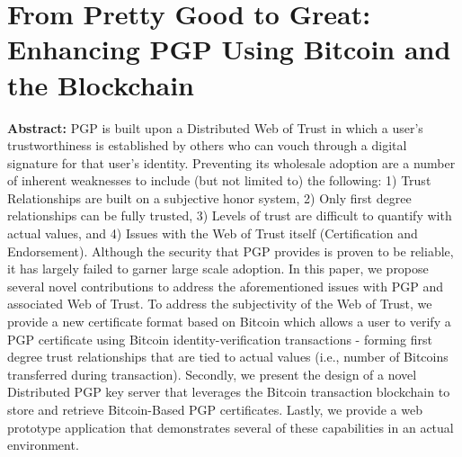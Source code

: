 \section{From Pretty Good to Great: Enhancing PGP Using Bitcoin and the Blockchain}

\textbf{Abstract:} 
PGP is built upon a Distributed Web of Trust in which a user’s trustworthiness is established by others who can vouch through a digital signature for that user’s identity. Preventing its wholesale adoption are a number of inherent weaknesses to include (but not limited to) the following: 1) Trust Relationships are built on a subjective honor system, 2) Only first degree relationships can be fully trusted, 3) Levels of trust are difficult to quantify with actual values, and 4) Issues with the Web of Trust itself (Certification and Endorsement). Although the security that PGP provides is proven to be reliable, it has largely failed to garner large scale adoption. In this paper, we propose several novel contributions to address the aforementioned issues with PGP and associated Web of Trust. To address the subjectivity of the Web of Trust, we provide a new certificate format based on Bitcoin which allows a user to verify a PGP certificate using Bitcoin identity-verification transactions - forming first degree trust relationships that are tied to actual values (i.e., number of Bitcoins transferred during transaction). Secondly, we present the design of a novel Distributed PGP key server that leverages the Bitcoin transaction blockchain to store and retrieve Bitcoin-Based PGP certificates. Lastly, we provide a web prototype application that demonstrates several of these capabilities in an actual environment.
